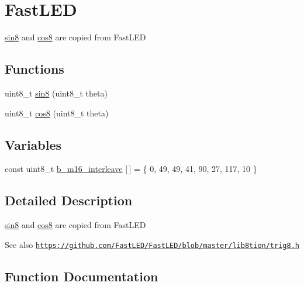 \hypertarget{group___fast_l_e_d}{}\section{Fast\+L\+ED}
\label{group___fast_l_e_d}


\hyperlink{group___fast_l_e_d_ga538b510f61cc75c8e4491f9f2797ee7c}{sin8} and \hyperlink{group___fast_l_e_d_ga007b62e82ea1556ea7b0e3d2656bce09}{cos8} are copied from Fast\+L\+ED  


\subsection*{Functions}
\begin{DoxyCompactItemize}
\item 
uint8\+\_\+t \hyperlink{group___fast_l_e_d_ga538b510f61cc75c8e4491f9f2797ee7c}{sin8} (uint8\+\_\+t theta)
\item 
uint8\+\_\+t \hyperlink{group___fast_l_e_d_ga007b62e82ea1556ea7b0e3d2656bce09}{cos8} (uint8\+\_\+t theta)
\end{DoxyCompactItemize}
\subsection*{Variables}
\begin{DoxyCompactItemize}
\item 
const uint8\+\_\+t \hyperlink{group___fast_l_e_d_gadc654138105ff193df0fbc7a0c21806c}{b\+\_\+m16\+\_\+interleave} \mbox{[}$\,$\mbox{]} = \{ 0, 49, 49, 41, 90, 27, 117, 10 \}
\end{DoxyCompactItemize}


\subsection{Detailed Description}
\hyperlink{group___fast_l_e_d_ga538b510f61cc75c8e4491f9f2797ee7c}{sin8} and \hyperlink{group___fast_l_e_d_ga007b62e82ea1556ea7b0e3d2656bce09}{cos8} are copied from Fast\+L\+ED 

\begin{DoxySeeAlso}{See also}
\href{https://github.com/FastLED/FastLED/blob/master/lib8tion/trig8.h}{\tt https\+://github.\+com/\+Fast\+L\+E\+D/\+Fast\+L\+E\+D/blob/master/lib8tion/trig8.\+h} 
\end{DoxySeeAlso}


\subsection{Function Documentation}
